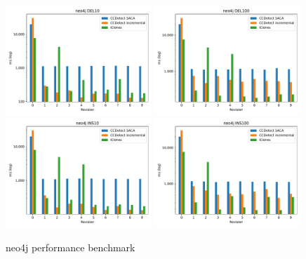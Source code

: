 \begin{figure}[H]
    \begin{center}
        \includegraphics[width=0.49\textwidth]{figures/performancegraphs/neo4j_DEL10.pdf}
        \includegraphics[width=0.49\textwidth]{figures/performancegraphs/neo4j_DEL100.pdf}
        \includegraphics[width=0.49\textwidth]{figures/performancegraphs/neo4j_INS10.pdf}
        \includegraphics[width=0.49\textwidth]{figures/performancegraphs/neo4j_INS100.pdf}
    \end{center}
    \caption{neo4j performance benchmark}
    \label{fig:neo4j}
\end{figure}


